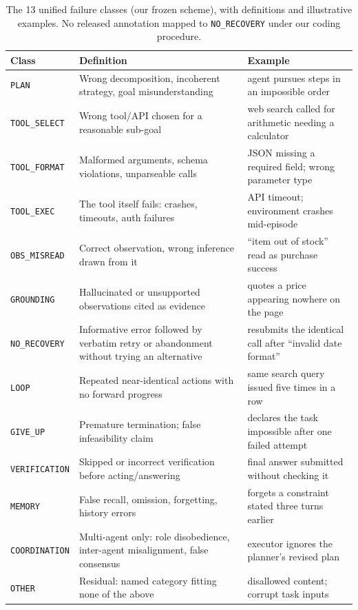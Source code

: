 \documentclass[12pt,letterpaper]{article}
\begin{document}
\begin{table}[t]
\centering
\caption{The 13 unified failure classes (our frozen scheme),
with definitions and illustrative examples. No released annotation mapped to
\texttt{NO\_RECOVERY} under our coding procedure.}
\label{tab:classes}
\begin{tabular}{@{}l p{} p{}@{}}
\toprule
Class & Definition & Example \\
\midrule
\texttt{PLAN} & Wrong decomposition, incoherent strategy, goal misunderstanding &
  agent pursues steps in an impossible order \\
\texttt{TOOL\_SELECT} & Wrong tool/API chosen for a reasonable sub-goal &
  web search called for arithmetic needing a calculator \\
\texttt{TOOL\_FORMAT} & Malformed arguments, schema violations, unparseable calls &
  JSON missing a required field; wrong parameter type \\
\texttt{TOOL\_EXEC} & The tool itself fails: crashes, timeouts, auth failures &
  API timeout; environment crashes mid-episode \\
\texttt{OBS\_MISREAD} & Correct observation, wrong inference drawn from it &
  ``item out of stock'' read as purchase success \\
\texttt{GROUNDING} & Hallucinated or unsupported observations cited as evidence &
  quotes a price appearing nowhere on the page \\
\texttt{NO\_RECOVERY} & Informative error followed by verbatim retry or
  abandonment without trying an alternative & resubmits the identical
  call after ``invalid date format'' \\
\texttt{LOOP} & Repeated near-identical actions with no forward progress &
  same search query issued five times in a row \\
\texttt{GIVE\_UP} & Premature termination; false infeasibility claim &
  declares the task impossible after one failed attempt \\
\texttt{VERIFICATION} & Skipped or incorrect verification before acting/answering &
  final answer submitted without checking it \\
\texttt{MEMORY} & False recall, omission, forgetting, history errors &
  forgets a constraint stated three turns earlier \\
\texttt{COORDINATION} & Multi-agent only: role disobedience, inter-agent
  misalignment, false consensus & executor ignores the planner's revised plan \\
\texttt{OTHER} & Residual: named category fitting none of the above &
  disallowed content; corrupt task inputs \\
\bottomrule
\end{tabular}
\end{table}
\end{document}
